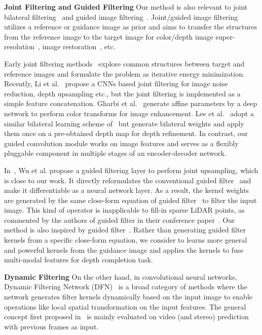 \documentclass[journal]{IEEEtran}
\begin{document}
{\bf Joint Filtering and Guided Filtering}
Our method is also relevant to joint bilateral filtering~\cite{bilateral_filter} and guided image filtering~\cite{guided_filter}.
Joint/guided image filtering utilizes a reference or guidance image as prior and aims to transfer the structures from the reference image to the target image
for color/depth image super-resolution~\cite{joint_upsampling, spatial_depth_range}, image restoration~\cite{cross_restoration}, etc.

Early joint filtering methods~\cite{rolling_filter,mutual_filtering,robust_joint_filter} explore common structures between target and reference images
and formulate the problem as iterative energy minimization.  
Recently, Li et al.~\cite{deep_joint_filtering} propose a CNNs based joint filtering for image noise reduction, depth upsampling etc.,
but the joint filtering is implemented as a simple feature concatenation.
Gharbi et al.~\cite{deep_bilateral} generate affine parameters by a deep network to perform color transforms for image enhancement.
Lee et al.~\cite{depth_comp_geo_con} adopt a similar bilateral learning scheme of~\cite{deep_bilateral}
but generate bilateral weights and apply them once on a pre-obtained depth map for depth refinement. 
In contrast, our guided convolution module works on image features and serves as a flexibly pluggable component in multiple stages of an encoder-decoder network. 
 
In~\cite{fast_guide_filter}, Wu et al. propose a guided filtering layer to perform joint upsampling, which is close to our work.
It directly reformulates the conventional guided filter~\cite{guided_filter} and make it differentiable as a neural network layer.
As a result, the kernel weights are generated by the same close-form equation of guided filter~\cite{guided_filter} to filter the input image.
This kind of operator is inapplicable to fill-in sparse LiDAR points, as commented by the authors of guided filter in their conference paper~\cite{guided_filter_conf}.
Our method is also inspired by guided filter~\cite{guided_filter}. Rather than generating guided filter kernels from a specific close-form equation, 
we consider to learns more general and powerful kernels from the guidance image and applies the kernels to fuse multi-modal features for depth completion task. 


{\bf Dynamic Filtering}
On the other hand, in convolutional neural networks, Dynamic Filtering Network (DFN)~\cite{dynamic_filter} is a broad category of methods
where the network generates filter kernels dynamically based on the input image to enable operations like local spatial transformation on the input features.
The general concept first proposed in~\cite{dynamic_filter} is mainly evaluated on video (and stereo) prediction with previous frames as input.
\end{document}
